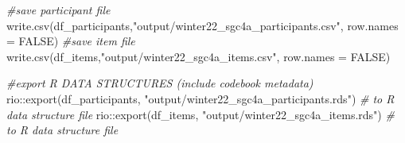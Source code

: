 \documentclass[
]{article}
\newenvironment{Shaded}{\begin{snugshade}}{\end{snugshade}}
\newcommand{\AttributeTok}[1]{\textcolor[rgb]{0.77,0.63,0.00}{#1}}
\newcommand{\CommentTok}[1]{\textcolor[rgb]{0.56,0.35,0.01}{\textit{#1}}}
\newcommand{\ConstantTok}[1]{\textcolor[rgb]{0.00,0.00,0.00}{#1}}
\newcommand{\FunctionTok}[1]{\textcolor[rgb]{0.00,0.00,0.00}{#1}}
\newcommand{\NormalTok}[1]{#1}
\newcommand{\SpecialCharTok}[1]{\textcolor[rgb]{0.00,0.00,0.00}{#1}}
\newcommand{\StringTok}[1]{\textcolor[rgb]{0.31,0.60,0.02}{#1}}
\begin{document}
\begin{Shaded}
\begin{Highlighting}[]
\CommentTok{\#save participant file}
\FunctionTok{write.csv}\NormalTok{(df\_participants,}\StringTok{"output/winter22\_sgc4a\_participants.csv"}\NormalTok{, }\AttributeTok{row.names =} \ConstantTok{FALSE}\NormalTok{)}
\CommentTok{\#save item file}
\FunctionTok{write.csv}\NormalTok{(df\_items,}\StringTok{"output/winter22\_sgc4a\_items.csv"}\NormalTok{, }\AttributeTok{row.names =} \ConstantTok{FALSE}\NormalTok{)}

\CommentTok{\#export R DATA STRUCTURES (include codebook metadata)}
\NormalTok{rio}\SpecialCharTok{::}\FunctionTok{export}\NormalTok{(df\_participants, }\StringTok{"output/winter22\_sgc4a\_participants.rds"}\NormalTok{) }\CommentTok{\# to R data structure file}
\NormalTok{rio}\SpecialCharTok{::}\FunctionTok{export}\NormalTok{(df\_items, }\StringTok{"output/winter22\_sgc4a\_items.rds"}\NormalTok{) }\CommentTok{\# to R data structure file}
\end{Highlighting}
\end{Shaded}
\end{document}
